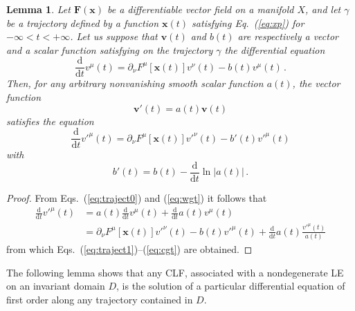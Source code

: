 \documentclass{article}
\theoremstyle{plain}
\newtheorem{lemma}[theorem]{Lemma}
\theoremstyle{definition}
\theoremstyle{remark}
\newcommand{\vect}[1]{\boldsymbol{#1}}
\begin{document}
\begin{lemma}\label{lemma0}
Let $\vect{F}(\vect{x})$ be a differentiable vector field 
on a manifold $X$, and let $\gamma$
be a trajectory defined by a
  function $\vect{x}(t)$ satisfying Eq.~(\ref{eq:xp}) for
  $-\infty<t<+\infty$.
Let us suppose that $\vect v(t)$ and $b(t)$
are respectively a vector and a scalar function satisfying on the
trajectory $\gamma$ the differential equation
 \begin{equation}
    \frac{\mathrm{d}}{\mathrm{d}t} v^{\mu}(t) =
    \partial_\nu F^{\mu} [\vect x(t)]v^{\nu}(t) -   b(t) v^{\mu}(t)\,.
    \label{eq:traject0}
  \end{equation}  
Then, for any arbitrary nonvanishing smooth scalar function
$a(t)$, the vector function
\begin{equation}\label{eq:wgt}
\vect{v}'(t)=a(t)\vect{v}(t) 
\end{equation}
satisfies the equation
\begin{equation}
    \frac{\mathrm{d}}{\mathrm{d}t} v'^{\mu}(t) =
    \partial_\nu F^{\mu}[\vect x(t)] v'^{\nu}(t) -   b' (t)v'^{\mu}(t)
    \label{eq:traject1}
  \end{equation}  
with 
\begin{equation}\label{eq:cgt}
  b'(t)=b(t) - \frac{\mathrm{d}}{\mathrm{d} t} \ln\left|a(t)\right| 
  \, .
\end{equation}
\end{lemma}
\begin{proof}
From Eqs.~(\ref{eq:traject0}) and (\ref{eq:wgt}) it follows that
\begin{align*}
\frac{\mathrm{d}}{\mathrm{d}t} v'^{\mu}(t) &=
a(t)\frac{\mathrm{d}}{\mathrm{d}t} v^{\mu}(t)+
\frac{\mathrm{d}}{\mathrm{d}t}a(t) v^{\mu}(t) \\
&=\partial_\nu F^{\mu}[\vect x(t)] v'^{\nu}(t) -   b (t)v'^{\mu}(t)+
\frac{\mathrm{d}}{\mathrm{d}t} a(t) \frac {v'^\mu(t)}{a(t)} 
\end{align*}
from which Eqs.~(\ref{eq:traject1})--(\ref{eq:cgt}) are obtained.
\end{proof}

The following lemma shows that any CLF, associated with a
nondegenerate LE on an invariant domain $D$,
is the solution of a particular differential
equation of first order along any trajectory contained in $D$.
\end{document}
